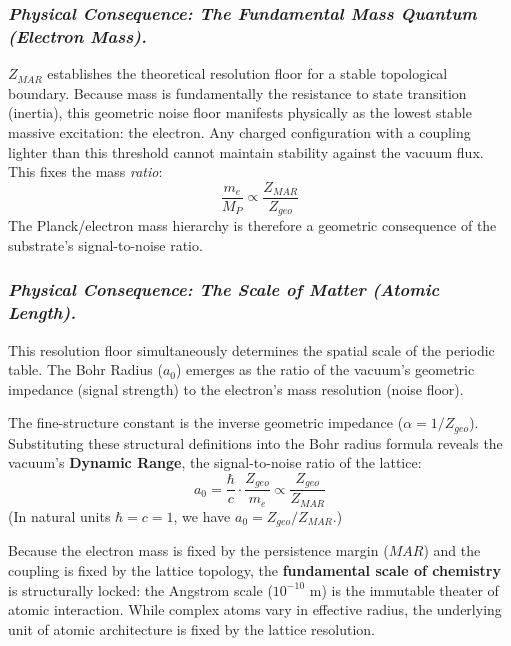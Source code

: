 
\subsubsection{\textit{Physical Consequence: The Fundamental Mass Quantum (Electron Mass).}}
$Z_{MAR}$ establishes the theoretical resolution floor for a stable topological boundary. Because mass is fundamentally the resistance to state transition (inertia), this geometric noise floor manifests physically as the lowest stable massive excitation: the electron. Any charged configuration with a coupling lighter than this threshold cannot maintain stability against the vacuum flux. This fixes the mass \textit{ratio}:
\begin{equation}
\frac{m_e}{M_P} \propto \frac{Z_{MAR}}{Z_{geo}}
\end{equation}
The Planck/electron mass hierarchy is therefore a geometric consequence of the substrate's signal-to-noise ratio.

\subsubsection{\textit{Physical Consequence: The Scale of Matter (Atomic Length).}}
This resolution floor simultaneously determines the spatial scale of the periodic table. The Bohr Radius ($a_0$) emerges as the ratio of the vacuum's geometric impedance (signal strength) to the electron's mass resolution (noise floor).

The fine-structure constant is the inverse geometric impedance ($\alpha = 1/Z_{geo}$). Substituting these structural definitions into the Bohr radius formula reveals the vacuum's \textbf{Dynamic Range}, the signal-to-noise ratio of the lattice:
\begin{equation}
a_0 = \frac{\hbar}{c} \cdot \frac{Z_{geo}}{m_e} \propto \frac{Z_{geo}}{Z_{MAR}}
\end{equation}
(In natural units $\hbar = c = 1$, we have $a_0 = Z_{geo}/Z_{MAR}$.)

Because the electron mass is fixed by the persistence margin ($MAR$) and the coupling is fixed by the lattice topology, the \textbf{fundamental scale of chemistry} is structurally locked: the Angstrom scale ($10^{-10}$ m) is the immutable theater of atomic interaction. While complex atoms vary in effective radius, the underlying unit of atomic architecture is fixed by the lattice resolution.
